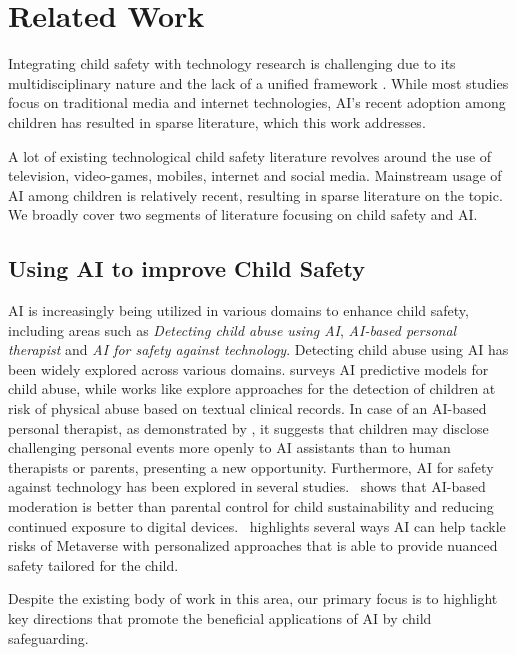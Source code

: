 \section{Related Work}
Integrating child safety with technology research is challenging due to its multidisciplinary nature and the lack of a unified framework \cite{livingstone2014annual}. While most studies focus on traditional media and internet technologies, AI's recent adoption among children has resulted in sparse literature, which this work addresses.

A lot of existing technological child safety literature revolves around the use of television, video-games, mobiles, internet and social media. Mainstream usage of AI among children is relatively recent, resulting in sparse literature on the topic. We broadly cover two segments of literature focusing on child safety and AI.

\subsection{Using AI to improve Child Safety}
AI is increasingly being utilized in various domains to enhance child safety, including areas such as \textit{Detecting child abuse using AI}, \textit{AI-based personal therapist} and \textit{AI for safety against technology}. Detecting child abuse using AI has been widely explored across various domains. \citet{lupariello2023artificial} surveys AI predictive models for child abuse, while works like \cite{amrit2017identifying, annapragada2021natural} explore approaches for the detection of children at risk of physical abuse based on textual clinical records. In case of an AI-based personal therapist, as demonstrated by \citet{seo2023chacha}, it suggests that children may disclose challenging personal events more openly to AI assistants than to human therapists or parents, presenting a new opportunity. Furthermore, AI for safety against technology has been explored in several studies.~\citet{alrusaini2022sustainable} shows that AI-based moderation is better than parental control for child sustainability and reducing continued exposure to digital devices.~\citet{zhuk2024ethical} highlights several ways AI can help tackle risks of Metaverse with personalized approaches that is able to provide nuanced safety tailored for the child.


Despite the existing body of work in this area, our primary focus is to highlight key directions that promote the beneficial applications of AI by child safeguarding.




